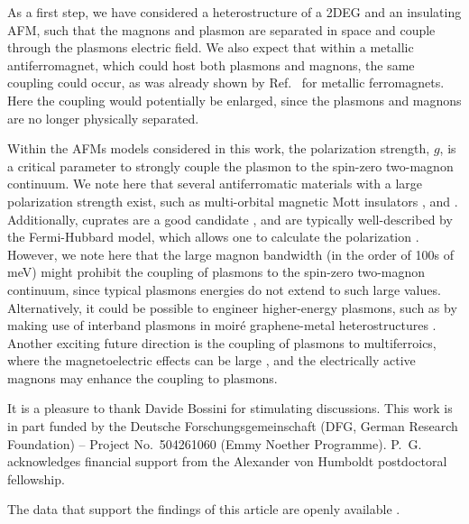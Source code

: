\documentclass[aps,prb,reprint,twocolumns,superscriptaddress,nofootinbib]{revtex4-2}
\begin{document}
	
	As a first step, we have considered a heterostructure of a 2DEG and an insulating AFM, such that the magnons and plasmon are separated in space and couple through the plasmons electric field. We also expect that within a metallic antiferromagnet, which could host both plasmons and magnons, the same coupling could occur, as was already shown by Ref.~\cite{ghoshPlasmonmagnonInteractionsTwodimensional2023} for metallic ferromagnets. Here the coupling would potentially be enlarged, since the plasmons and magnons are no longer physically separated.
	
	Within the AFMs models considered in this work, the polarization strength, $g$, is a critical parameter to strongly couple the plasmon to the spin-zero two-magnon continuum. We note here that several antiferromatic materials with a large polarization strength exist, such as multi-orbital magnetic Mott insulators \cite{bolensTheoryElectronicMagnetoelectric2018},  \cite{seifertOpticalExcitationMagnons2019} and  \cite{mostovoyTemperatureDependentMagnetoelectricEffect2010}. Additionally, cuprates are a good candidate \cite{curtisCavityMagnonpolaritonsCuprate2022,shanDynamicMagneticPhase2024}, and are typically well-described by the Fermi-Hubbard model, which allows one to calculate the polarization \cite{zhuSpinorbitCouplingElectronic2014}. However, we note here that the large magnon bandwidth (in the order of 100s of meV) might prohibit the coupling of plasmons to the spin-zero two-magnon continuum, since typical plasmons energies do not extend to such large values. Alternatively, it could be possible to engineer higher-energy plasmons, such as by making use of interband plasmons in moir\'e graphene-metal heterostructures \cite{politanoEffectMoireSuperlattice2017}. Another exciting future direction is the coupling of plasmons to multiferroics, where the magnetoelectric effects can be large \cite{kimuraMagneticControlFerroelectric2003, wangEpitaxialBiFeO3Multiferroic2003}, and the electrically active magnons \cite{katsuraDynamicalMagnetoelectricCoupling2007, pimenovPossibleEvidenceElectromagnons2006, sushkovElectromagnonsMultiferroicYMn2O52007} may enhance the coupling to plasmons.
	
	
	
	
	\begin{acknowledgments}
		It is a pleasure to thank Davide Bossini for stimulating discussions. This work is in part funded by the Deutsche Forschungsgemeinschaft (DFG, German Research Foundation) -- Project No.~504261060 (Emmy Noether Programme). P.~G. acknowledges financial support from the Alexander von Humboldt postdoctoral fellowship.
	\end{acknowledgments}
	The data that support the findings of this article are openly available \cite{pgunninkPgunninkMagnonplasmonlifetimeV12025}.
	
\end{document}
